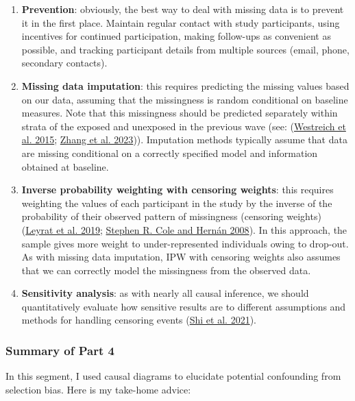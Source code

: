 \documentclass[
  singlecolumn]{article}
\begin{document}
\begin{enumerate}
\def\labelenumi{\arabic{enumi}.}
\item
  \textbf{Prevention}: obviously, the best way to deal with missing data
  is to prevent it in the first place. Maintain regular contact with
  study participants, using incentives for continued participation,
  making follow-ups as convenient as possible, and tracking participant
  details from multiple sources (email, phone, secondary contacts).
\item
  \textbf{Missing data imputation}: this requires predicting the missing
  values based on our data, assuming that the missingness is random
  conditional on baseline measures. Note that this missingness should be
  predicted separately within strata of the exposed and unexposed in the
  previous wave (see: (\protect\hyperlink{ref-westreich2015}{Westreich
  et al. 2015}; \protect\hyperlink{ref-zhang2023}{Zhang et al. 2023})).
  Imputation methods typically assume that data are missing conditional
  on a correctly specified model and information obtained at baseline.
\item
  \textbf{Inverse probability weighting with censoring weights}: this
  requires weighting the values of each participant in the study by the
  inverse of the probability of their observed pattern of missingness
  (censoring weights)(\protect\hyperlink{ref-leyrat2019}{Leyrat et al.
  2019}; \protect\hyperlink{ref-cole2008}{Stephen R. Cole and Hernán
  2008}). In this approach, the sample gives more weight to
  under-represented individuals owing to drop-out. As with missing data
  imputation, IPW with censoring weights also assumes that we can
  correctly model the missingness from the observed data.
\item
  \textbf{Sensitivity analysis}: as with nearly all causal inference, we
  should quantitatively evaluate how sensitive results are to different
  assumptions and methods for handling censoring events
  (\protect\hyperlink{ref-shi2021}{Shi et al. 2021}).
\end{enumerate}

\hypertarget{summary-of-part-4}{%
\subsubsection{Summary of Part 4}\label{summary-of-part-4}}

In this segment, I used causal diagrams to elucidate potential
confounding from selection bias. Here is my take-home advice:
\end{document}
